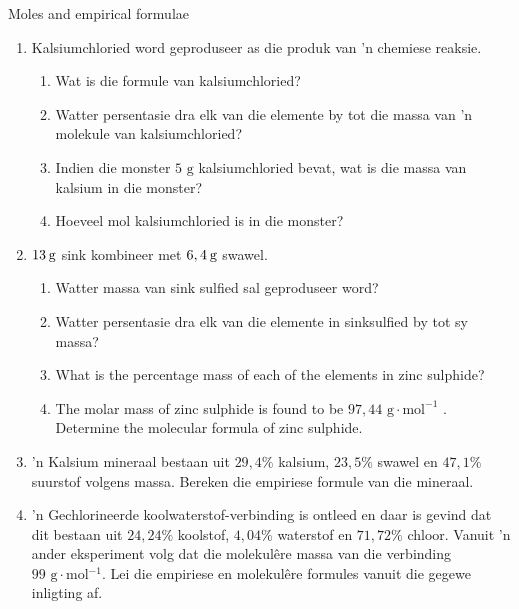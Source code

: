            \begin{exercises}{Moles and empirical formulae}
            \nopagebreak \noindent \vspace{-2cm}
      \label{m38712*id281924}\begin{enumerate}[noitemsep, label=\textbf{\arabic*}. ] 
            \label{m38712*uid73}\item Kalsiumchloried word geproduseer as die produk van  'n chemiese reaksie.
\label{m38712*id281940}\begin{enumerate}[noitemsep, label=\textbf{\alph*}. ] 
            \label{m38712*uid74}\item Wat is die formule van kalsiumchloried?
\label{m38712*uid75}\item Watter persentasie dra elk van die elemente by tot die massa van  'n molekule van kalsiumchloried?
\label{m38712*uid76}\item Indien die monster $5 \text{ g}$ kalsiumchloried bevat, wat is die massa van kalsium in die monster?
\label{m38712*uid77}\item Hoeveel mol kalsiumchloried is in die monster?
\end{enumerate}
                \label{m38712*uid78}\item $13\phantom{\rule{2pt}{0ex}}\text{g}$ sink kombineer met $6,4\phantom{\rule{2pt}{0ex}}\text{g}$ swawel.
\label{m38712*id282007}\begin{enumerate}[noitemsep, label=\textbf{\alph*}. ] 
\item  Watter massa van sink sulfied sal geproduseer word?
            \label{m38712*uid79}\item Watter persentasie dra elk van die elemente in sinksulfied by tot sy massa?
\label{m38712*uid80}\item What is the percentage mass of each of the elements in zinc sulphide?
\label{m38712*uid81}\item The molar mass of zinc sulphide is found to be $97,44 \text{ g} \cdot \text{mol}^{−1}$ . Determine the molecular formula of zinc sulphide.
\end{enumerate}
                \label{m38712*uid82}\item  'n Kalsium mineraal bestaan ​​uit $29,4\%$ kalsium, $23,5\%$ swawel en $47,1\%$ suurstof volgens massa. Bereken die empiriese formule van die mineraal.
\label{m38712*uid83}\item  'n Gechlorineerde koolwaterstof-verbinding is ontleed en daar is gevind dat dit bestaan ​​uit $24,24\%$ koolstof, $4,04\%$ waterstof en $71,72\%$ chloor. Vanuit   'n ander eksperiment volg dat die molekul\^{e}re massa van die verbinding $99\text{ g} \cdot \text{mol}{}^{-1}$. Lei die empiriese en molekulêre formules vanuit die gegewe inligting af.

\end{enumerate}
\end{exercises}
